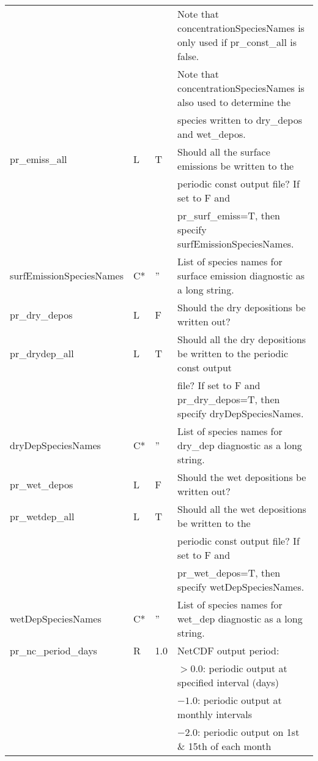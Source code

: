 {\begin{landscape}
\begin{center}
\begin{longtable}{|l|l|l|l|}
                          &   &      & Note that concentrationSpeciesNames is only used if pr\_const\_all is false.  \\
                          &   &      & Note that concentrationSpeciesNames is also used to determine the \\
                          &   &      & species written to dry\_depos and wet\_depos.  \\ \hline
pr\_emiss\_all        & L & T & Should all the surface emissions be written to the  \\
                      &   &   & periodic const output file? If set to F and  \\
                      &   &   & pr\_surf\_emiss=T, then specify surfEmissionSpeciesNames.  \\ \hline
surfEmissionSpeciesNames & C* &  ''  & List of species names for surface emission diagnostic as a long string.  \\ \hline
pr\_dry\_depos   & L & F & Should the dry depositions be written out?  \\ \hline
pr\_drydep\_all        & L & T & Should all the dry depositions be written to the periodic const output   \\
                      &   &   & file? If set to F and pr\_dry\_depos=T, then specify dryDepSpeciesNames.  \\ \hline
dryDepSpeciesNames & C* &  ''  & List of species names for dry\_dep diagnostic as a long string.  \\ \hline
pr\_wet\_depos   & L & F & Should the wet depositions be written out?  \\ \hline
pr\_wetdep\_all        & L & T & Should all the wet depositions be written to the  \\
                      &   &   & periodic const output file? If set to F and  \\
                      &   &   & pr\_wet\_depos=T, then specify wetDepSpeciesNames.  \\ \hline
wetDepSpeciesNames & C* &  ''  & List of species names for wet\_dep diagnostic as a long string.  \\ \hline
pr\_nc\_period\_days      & R &  1.0 & NetCDF output period:  \\
                          &   &      & $>0.0$:  periodic output at specified interval (days)  \\
                          &   &      & $-1.0$:  periodic output at monthly intervals  \\
                          &   &      & $-2.0$:  periodic output on 1st \& 15th of each month  \\ \hline

\end{longtable}
\end{center}
\end{landscape}}
